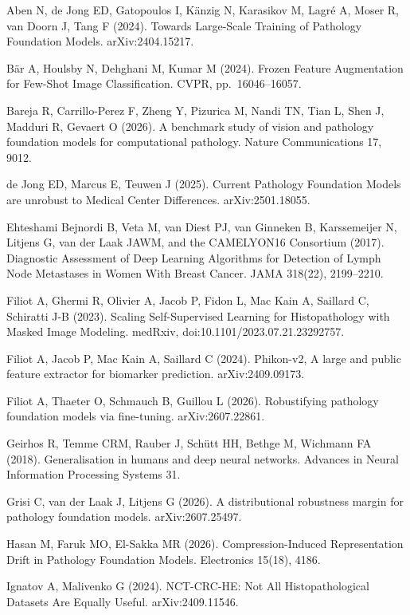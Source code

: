 \documentclass[11pt,a4paper]{article}
\begin{document}
\begin{list}{}{\setlength{\leftmargin}{1.5em}\setlength{\itemindent}{-1.5em}\setlength{\itemsep}{0.25em}\setlength{\parsep}{0pt}}\small\raggedright
\item Aben N, de Jong ED, Gatopoulos I, K\"anzig N, Karasikov M, Lagr\'e A, Moser R, van Doorn J, Tang F (2024). Towards Large-Scale Training of Pathology Foundation Models. arXiv:2404.15217.
\item B\"ar A, Houlsby N, Dehghani M, Kumar M (2024). Frozen Feature Augmentation for Few-Shot Image Classification. CVPR, pp.\ 16046--16057.
\item Bareja R, Carrillo-Perez F, Zheng Y, Pizurica M, Nandi TN, Tian L, Shen J, Madduri R, Gevaert O (2026). A benchmark study of vision and pathology foundation models for computational pathology. Nature Communications 17, 9012.
\item de Jong ED, Marcus E, Teuwen J (2025). Current Pathology Foundation Models are unrobust to Medical Center Differences. arXiv:2501.18055.
\item Ehteshami Bejnordi B, Veta M, van Diest PJ, van Ginneken B, Karssemeijer N, Litjens G, van der Laak JAWM, and the CAMELYON16 Consortium (2017). Diagnostic Assessment of Deep Learning Algorithms for Detection of Lymph Node Metastases in Women With Breast Cancer. JAMA 318(22), 2199--2210.
\item Filiot A, Ghermi R, Olivier A, Jacob P, Fidon L, Mac Kain A, Saillard C, Schiratti J-B (2023). Scaling Self-Supervised Learning for Histopathology with Masked Image Modeling. medRxiv, doi:10.1101/2023.07.21.23292757.
\item Filiot A, Jacob P, Mac Kain A, Saillard C (2024). Phikon-v2, A large and public feature extractor for biomarker prediction. arXiv:2409.09173.
\item Filiot A, Thaeter O, Schmauch B, Guillou L (2026). Robustifying pathology foundation models via fine-tuning. arXiv:2607.22861.
\item Geirhos R, Temme CRM, Rauber J, Sch\"utt HH, Bethge M, Wichmann FA (2018). Generalisation in humans and deep neural networks. Advances in Neural Information Processing Systems 31.
\item Grisi C, van der Laak J, Litjens G (2026). A distributional robustness margin for pathology foundation models. arXiv:2607.25497.
\item Hasan M, Faruk MO, El-Sakka MR (2026). Compression-Induced Representation Drift in Pathology Foundation Models. Electronics 15(18), 4186.
\item Ignatov A, Malivenko G (2024). NCT-CRC-HE: Not All Histopathological Datasets Are Equally Useful. arXiv:2409.11546.

\end{list}
\end{document}
